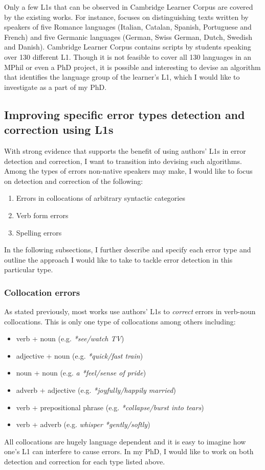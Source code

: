 \documentclass[11pt]{article}
\begin{document}
Only a few L1s that can be observed in Cambridge Learner Corpus are covered by 
the existing works. For instance, \cite{kochmar2011identification} focuses on 
distinguishing texts written by speakers of five Romance languages (Italian, Catalan, 
Spanish, Portuguese and French) and five Germanic languages (German, Swiss 
German, Dutch, Swedish and Danish). Cambridge Learner Corpus contains scripts by 
students speaking over 130 different L1. Though it is not 
feasible to cover all 130 languages in an MPhil or even a PhD project, it is 
possible and interesting to devise an algorithm that identifies the language 
group of the learner's L1, which I would like to investigate as a part of my 
PhD.

\subsection{Improving specific error types detection and correction using L1s
	}
With strong evidence that supports the benefit of using authors' L1s in error 
detection and correction, I want to transition into devising such algorithms.
Among the types of errors non-native speakers may make, I would like to focus on 
detection and correction of the following:
\begin{enumerate}
\item Errors in collocations of arbitrary syntactic categories\label{error:1}
\item Verb form errors \label{error:2}
\item Spelling errors \label{error:3}
\end{enumerate}

In the following subsections, I further describe and specify each error type and outline the approach I would like to take to tackle error detection in this particular type.


\subsubsection{Collocation errors}
\label{subsub:collocation}
As stated previously, most works use authors' L1s to \emph{correct} errors in 
verb-noun collocations. This is only one type of collocations among others including:
\begin{itemize}
\item verb + noun (e.g. \emph{*see/watch TV})
\item adjective + noun (e.g. \emph{*quick/fast train})
\item noun + noun (e.g. \emph{a *feel/sense of pride})
\item adverb + adjective (e.g. \emph{*joyfully/happily married})
\item verb + prepositional phrase (e.g. \emph{*collapse/burst into tears})
\item verb + adverb (e.g. \emph{whisper *gently/softly})
\end{itemize}
All collocations are hugely language dependent and it is easy to imagine how 
one's L1 can interfere to cause errors. In my PhD, I would like to work on both 
detection and correction for each type listed above.
\end{document}
